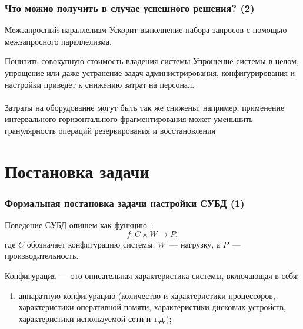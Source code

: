 \documentclass[unicode]{beamer}
\begin{document}
\begin{frame}
\frametitle{Что можно получить в случае успешного решения? (2)}

\begin{block}{Межзапросный параллелизм}
Ускорит выполнение набора запросов с помощью межзапросного параллелизма.
\end{block}

\begin{block}{Понизить совокупную стоимость владения системы}
Упрощение системы в целом, упрощение или даже устранение задач администрирования, конфигурирования и настройки приведет к снижению затрат на персонал. 
\\~\\
Затраты на оборудование могут быть так же снижены: например, применение интервального горизонтального фрагментирования может уменьшить гранулярность операций резервирования и восстановления \cite{p3}
\end{block}


\end{frame}

\section{Постановка задачи}


\begin{frame}
\frametitle{Формальная постановка задачи настройки СУБД (1)}

\begin{block}{Поведение СУБД опишем как функцию \cite{p4}:}
$$f: C \times W \rightarrow P,$$
 где $C$ обозначает конфигурацию системы, $W$~--- нагрузку, а $P$~--- производительность. 
\end{block}

Конфигурация~--- это описательная характеристика системы, включающая в себя:

\begin{enumerate}
  \item аппаратную конфигурацию (количество и характеристики процессоров, характеристики оперативной памяти, характеристики дисковых устройств, характеристики используемой сети и т.д.);

\end{enumerate}
\end{frame}
\end{document}
